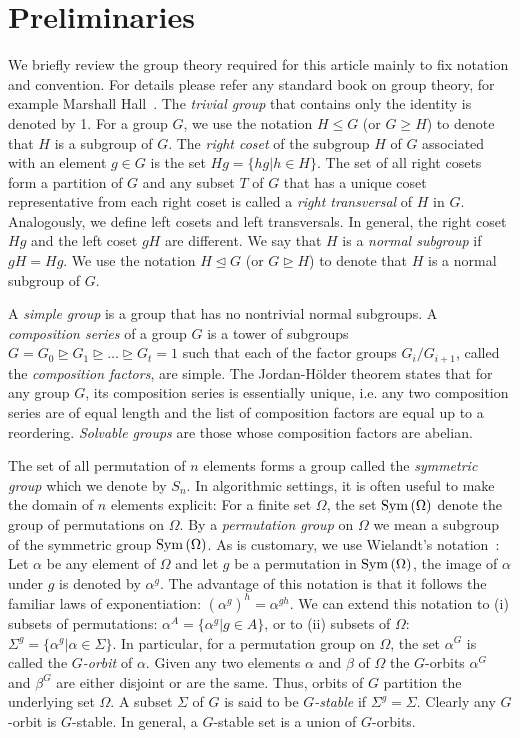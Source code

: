 \documentclass{article}
\begin{document}
\section{Preliminaries}

We briefly review the group theory required for this article mainly to
fix notation and convention. For details please refer any standard
book on group theory, for example Marshall Hall~\cite{hall}. The
\emph{trivial group} that contains only the identity is denoted by
1. For a group $G$, we use the notation $H \leqslant G$ (or $G
\geqslant H$) to denote that $H$ is a subgroup of $G$. The \emph{right
  coset} of the subgroup $H$ of $G$ associated with an element $g\in
G$ is the set $Hg = \{ h g | h \in H\}$. The set of all right cosets
form a partition of $G$ and any subset $T$ of $G$ that has a unique
coset representative from each right coset is called a \emph{right
  transversal} of $H$ in $G$. Analogously, we define left cosets and
left transversals. In general, the right coset $Hg$ and the left coset
$gH$ are different. We say that $H$ is a \emph{normal subgroup} if $gH
= Hg$. We use the notation $H \unlhd G$ (or $G \unrhd H$) to denote
that $H$ is a normal subgroup of $G$.

A \emph{simple group} is a group that has no nontrivial normal
subgroups. A \emph{composition series} of a group $G$ is a tower of
subgroups $G = G_0 \unrhd G_1 \unrhd \ldots \unrhd G_t = 1$ such that
each of the factor groups $G_i/G_{i+1}$, called the \emph{composition
  factors}, are simple. The Jordan-H\"older theorem states that for
any group $G$, its composition series is essentially unique, i.e. any
two composition series are of equal length and the list of composition
factors are equal up to a reordering. \emph{Solvable groups} are those
whose composition factors are abelian.

The set of all permutation of $n$ elements forms a group called the
\emph{symmetric group} which we denote by $S_n$. In algorithmic
settings, it is often useful to make the domain of $n$ elements
explicit: For a finite set $\Omega$, the set $\mathrm{Sym}\left(\Omega\right)$ denote the
group of permutations on $\Omega$. By a \emph{permutation group} on
$\Omega$ we mean a subgroup of the symmetric group $\mathrm{Sym}\left(\Omega\right)$. As
is customary, we use Wielandt's notation~\cite{wielandt64finite}: Let
$\alpha$ be any element of $\Omega$ and let $g$ be a permutation in
$\mathrm{Sym}\left(\Omega\right)$, the image of $\alpha$ under $g$ is denoted by
$\alpha^g$. The advantage of this notation is that it follows the
familiar laws of exponentiation: $(\alpha^g)^h = \alpha^{gh}$. We can
extend this notation to (i) subsets of permutations: $\alpha^A =
\{\alpha^g | g \in A \}$, or to (ii) subsets of $\Omega$: $\Sigma^g =
\{ \alpha^g | \alpha \in \Sigma \}$. In particular, for a permutation
group on $\Omega$, the set $\alpha^G$ is called the \emph{$G$-orbit}
of $\alpha$. Given any two elements $\alpha$ and $\beta$ of $\Omega$
the $G$-orbits $\alpha^G$ and $\beta^G$ are either disjoint or are the
same. Thus, orbits of $G$ partition the underlying set $\Omega$. A
subset $\Sigma$ of $G$ is said to be \emph{$G$-stable} if $\Sigma^g =
\Sigma$. Clearly any $G$-orbit is $G$-stable. In general, a $G$-stable
set is a union of $G$-orbits.
\end{document}
